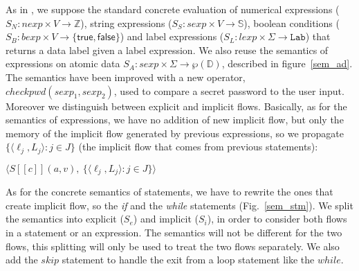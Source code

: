 \documentclass{llncs}
\newcommand{\parts}[1]{\ensuremath{\wp(#1)}}
\newcommand{\true}{\cel{true}}
\newcommand{\false}{\cel{false}}
\newcommand{\cel}[1]{\ensuremath{\mathsf{#1}}}
\newcommand{\blangle}{\big\langle}
\newcommand{\brangle}{\big\rangle}
\newcommand{\notegian}[1]{\textbf{(NOTE: #1)}}
\begin{document}
As in \cite{Cortesi15}, we suppose the standard concrete evaluation of numerical expressions ($S_N : nexp \times V \to \mathds{Z}$), string expressions ($S_S : sexp \times V \to\mathds{S}$), boolean conditions ($S_B : bexp \times V \to \{\true, \false\}$) and label expressions ($S_L : lexp \times \Sigma \to \mathtt{Lab}$) that returns a data label given a label expression. We also reuse the semantics of expressions on atomic data $S_A : sexp \times \Sigma \to \parts{\mathds{D}}$, described in figure~\ref{sem_ad}. The semantics have been improved with a new operator, $checkpwd(sexp_1, sexp_2)$, used to compare a secret password to the user input.
Moreover we distinguish between explicit and implicit flows. Basically, as for the semantics of expressions, we have no addition of new implicit flow, but only the memory of the implicit flow generated by previous expressions, so we propagate $\{\langle \ell_j, L_j\rangle : j \in J\}$ (the implicit flow that comes from previous statements):
\begin{center}
$\blangle S [\![ c ]\!](a, v),\ \{\langle \ell_j, L_j\rangle : j \in J\}\brangle$
\end{center}
As for the concrete semantics of statements, we have to rewrite the ones that create implicit flow, so the \textit{if} and the \textit{while} statements (Fig.~\ref{sem_stm}). We split the semantics into explicit ($S_e$) and implicit ($S_i$), in order to consider both flows in a statement or an expression. The semantics will not be different for the two flows, this splitting will only be used to treat the two flows separately. We also add the $skip$ statement to handle the exit from a loop statement like the $while$.
\end{document}
